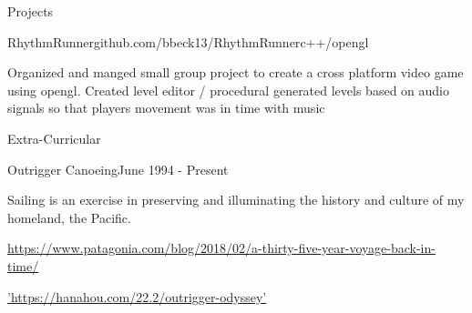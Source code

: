 \documentclass{resume} %
\begin{document}
\begin{rSection}{Projects} \itemsep -2pt
\begin{rSubsection}{RhythmRunner}{github.com/bbeck13/RhythmRunner}{c++/opengl}{}
\item Organized and manged small group project to create a cross platform video game using opengl. Created level editor / procedural generated levels based on audio signals so that players movement was in time with music

\end{rSubsection}

\end{rSection}

\begin{rSection}{Extra-Curricular}
\begin{rSubsection} {Outrigger Canoeing}{June 1994 - Present}{}{}
\item Sailing is an exercise in preserving and illuminating the history and culture of my homeland, the Pacific.
\item \href{https://www.patagonia.com/blog/2018/02/a-thirty-five-year-voyage-back-in-time/}{https://www.patagonia.com/blog/2018/02/a-thirty-five-year-voyage-back-in-time/}
\item \href{https://hanahou.com/22.2/outrigger-odyssey}{'https://hanahou.com/22.2/outrigger-odyssey'}
\end{rSubsection}
\end{rSection}
\end{document}
